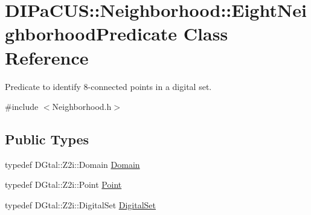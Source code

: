 \hypertarget{classDIPaCUS_1_1Neighborhood_1_1EightNeighborhoodPredicate}{}\section{D\+I\+Pa\+C\+US\+:\+:Neighborhood\+:\+:Eight\+Neighborhood\+Predicate Class Reference}
\label{classDIPaCUS_1_1Neighborhood_1_1EightNeighborhoodPredicate}


Predicate to identify 8-\/connected points in a digital set.  




{\ttfamily \#include $<$Neighborhood.\+h$>$}

\subsection*{Public Types}
\begin{DoxyCompactItemize}
\item 
typedef D\+Gtal\+::\+Z2i\+::\+Domain \hyperlink{classDIPaCUS_1_1Neighborhood_1_1EightNeighborhoodPredicate_a5b785c54edb99c2d2ea8d4bca6ca58c1}{Domain}
\item 
typedef D\+Gtal\+::\+Z2i\+::\+Point \hyperlink{classDIPaCUS_1_1Neighborhood_1_1EightNeighborhoodPredicate_af9c9177298acef079066017d8e5b36c8}{Point}
\item 
typedef D\+Gtal\+::\+Z2i\+::\+Digital\+Set \hyperlink{classDIPaCUS_1_1Neighborhood_1_1EightNeighborhoodPredicate_aa42d6c0cf104dd76dd52278138bdd7a4}{Digital\+Set}
\end{DoxyCompactItemize}
